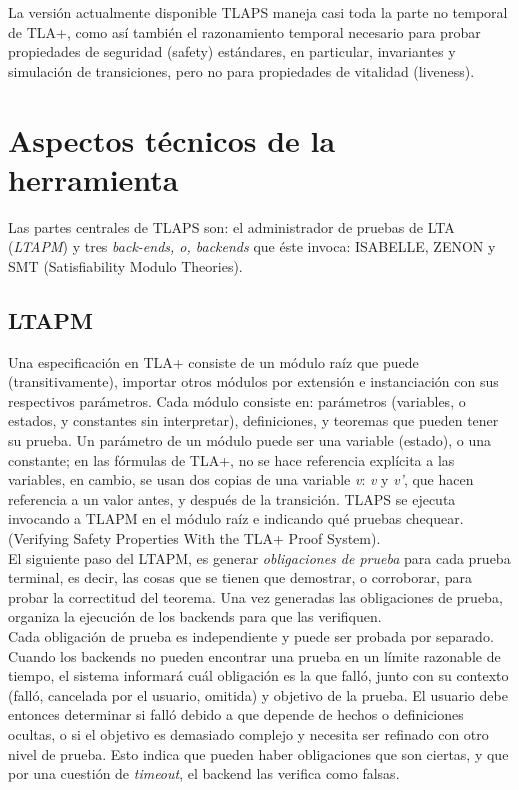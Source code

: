 \documentclass[spanish]{llncs}
\begin{document}
  La versión actualmente disponible TLAPS maneja casi toda la parte no temporal de TLA+, como así también el razonamiento temporal necesario para probar propiedades de 
  seguridad (safety) estándares, en particular, invariantes y simulación de transiciones, pero no para propiedades de vitalidad (liveness).


\section{Aspectos técnicos de la herramienta}

Las partes centrales de TLAPS son: el administrador de pruebas de LTA (\textit{LTAPM}) y tres \textit{back-ends, o, backends} que éste invoca: ISABELLE, ZENON y SMT (Satisfiability Modulo Theories).

  \subsection{LTAPM}
  
  Una especificación en TLA+ consiste de un módulo raíz que puede (transitivamente), importar otros módulos por extensión e instanciación con
  sus respectivos parámetros. Cada módulo consiste en: parámetros (variables, o estados, y constantes sin interpretar), definiciones,
  y teoremas que pueden tener su prueba. Un parámetro de un módulo puede ser una variable (estado), o una constante; en las fórmulas de TLA+, no se hace referencia explícita
  a las variables, en cambio, se usan dos copias de una variable \textit{v}: \textit{v} y \textit{v'}, que hacen referencia a un valor antes, y después de la transición. 
  TLAPS se ejecuta invocando a TLAPM en el módulo raíz e indicando qué pruebas chequear. (Verifying Safety Properties With the TLA+ Proof System).
  \\
  
  El siguiente paso del LTAPM, es generar \textit{obligaciones de prueba} para cada prueba terminal, es decir, las cosas que se tienen que demostrar, o corroborar, para
  probar la correctitud del teorema. Una vez generadas las obligaciones de prueba, organiza la ejecución de los backends para que las verifiquen.
  \\
  
  Cada obligación de prueba es independiente y puede ser probada por separado. Cuando los
  backends no pueden encontrar una prueba en un límite razonable de tiempo, el sistema
  informará cuál obligación es la que falló, junto con su contexto (falló, cancelada por el usuario, omitida) y objetivo de la prueba. El usuario debe
  entonces determinar si falló debido a que depende de hechos o definiciones ocultas, o si el objetivo es
  demasiado complejo y necesita ser refinado con otro nivel de prueba. Esto indica que pueden haber obligaciones que son ciertas, y que por una cuestión de \textit{timeout},
  el backend las verifica como falsas.
  \\
  
\end{document}

